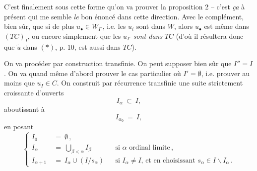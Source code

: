 \documentclass[11pt]{article}
\newcommand{\printedpage}[1]{\marginpar{\footnotesize p.~#1\ifstrequal{#1}{1}{\\[2pt]{[page 1]}}{}}}
\newcommand{\msp}[1]{\ifstrequal{#1}{page 1}{}{\marginpar{\footnotesize [#1]}}}
\begin{document}
C'est finalement sous cette forme qu'on va prouver la proposition 2 -- c'est \textit{ça} à présent qui me semble \textit{le} bon énoncé dans cette direction. Avec le complément, bien sûr, que si de plus $u_{\bullet} \in W_{I^{\circ}}$, i.e. les $u_i$ sont dans $W$, alors $u_{\bullet}$ est même dans $(TC)_I$, ou encore
\printedpage{7}
simplement que les $u_{I'}$ \textit{sont dans} $TC$ (d'où il résultera donc que $\tilde{u}$ dans $(*)$, p. 10, est aussi dans $TC$).

On va procéder par construction transfinie. On peut supposer bien sûr que $I'' = I$. On va quand même d'abord prouver le cas particulier où $I' = \emptyset$, i.e. prouver au moins que $u_I \in C$. On construit par récurrence transfinie une suite strictement croissante d'ouverts
\[
I_{\alpha} \ \subset \ I,
\]
aboutissant à
\[
I_{\alpha_0} \ = \ I,
\]
en posant
\[
\left\{
\begin{aligned}
I_0 \ &= \ \emptyset\,, \\
I_{\alpha} \ &= \ \textstyle\bigcup_{\beta < \alpha} I_{\beta} && \text{si $\alpha$ ordinal limite}\,, \\
I_{\alpha+1} \ &= \ I_{\alpha} \cup (I/s_{\alpha}) && \text{si $I_{\alpha} \neq I$, et en choisissant $s_{\alpha} \in I \backslash I_{\alpha}$}\,.
\end{aligned}
\right.
\]

\msp{page 12}
\end{document}
